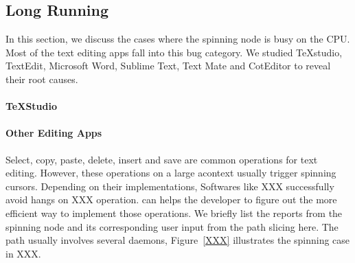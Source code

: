 \subsection{Long Running}

In this section, we discuss the cases where the spinning node is busy on the
CPU. Most of the text editing apps fall into this bug category. We studied
TeXstudio, TextEdit, Microsoft Word, Sublime Text, Text Mate and CotEditor to
reveal their root causes.

\paragraph{TeXStudio}


\paragraph{Other Editing Apps}

Select, copy, paste, delete, insert and save are common operations for text
editing. However, these operations on a large acontext usually trigger spinning
cursors. Depending on their implementations, Softwares like XXX successfully
avoid hangs on XXX operation. \xxx can helps the developer to figure out the
more efficient way to implement those operations. We briefly list the reports
from the spinning node and its corresponding user input from the path slicing
here. The path usually involves several daemons, Figure~\ref{XXX} illustrates
the spinning case in XXX.

